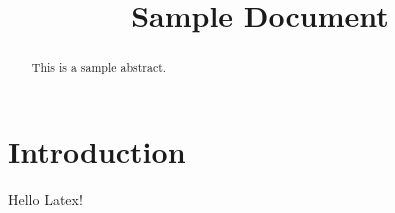 \documentclass[conference]{IEEEtran}
\begin{document}
\title{Sample Document}
\author{
}

\maketitle

\begin{abstract}
This is a sample abstract.
\end{abstract}

\section{Introduction}
Hello Latex!
\end{document}
